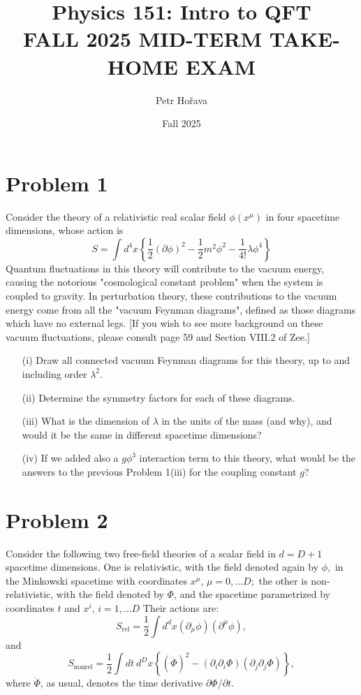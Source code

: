 \documentclass[12pt]{article}
\title{Physics 151: Intro to QFT \\ FALL 2025 MID-TERM TAKE-HOME EXAM}
\author{Petr Hořava}
\date{Fall 2025}
\begin{document}
\maketitle

\section*{Problem 1}

Consider the theory of a relativistic real scalar field $\phi(x^{\mu})$ in four spacetime dimensions, whose action is
$$S=\int d^{4}x\left\{\frac{1}{2}(\partial\phi)^{2}-\frac{1}{2}m^{2}\phi^{2}-\frac{1}{4!}\lambda\phi^{4}\right\}$$
Quantum fluctuations in this theory will contribute to the vacuum energy, causing the notorious "cosmological constant problem" when the system is coupled to gravity. In perturbation theory, these contributions to the vacuum energy come from all the "vacuum Feynman diagrams", defined as those diagrams which have no external legs. [If you wish to see more background on these vacuum fluctuations, please consult page 59 and Section VIII.2 of Zee.]

\begin{enumerate}
    \item[(i)] Draw all connected vacuum Feynman diagrams for this theory, up to and including order $\lambda^{2}.$
    \item[(ii)] Determine the symmetry factors for each of these diagrams.
    \item[(iii)] What is the dimension of $\lambda$ in the units of the mass (and why), and would it be the same in different spacetime dimensions?
    \item[(iv)] If we added also a $g\phi^{3}$ interaction term to this theory, what would be the answers to the previous Problem 1(iii) for the coupling constant $g$?
\end{enumerate}

\section*{Problem 2}

Consider the following two free-field theories of a scalar field in $d=D+1$ spacetime dimensions. One is relativistic, with the field denoted again by $\phi,$ in the Minkowski spacetime with coordinates $x^{\mu}$, $\mu=0,...D;$ the other is non-relativistic, with the field denoted by $\Phi$, and the spacetime parametrized by coordinates $t$ and $x^{i}$, $i=1,...D$ Their actions are:
$$S_{\text{rel}}=\frac{1}{2}\int d^{d}x(\partial_{\mu}\phi)(\partial^{\mu}\phi),$$
and
$$S_{\text{nonrel}}=\frac{1}{2}\int dt~d^{D}x\left\{(\dot{\Phi})^{2}-(\partial_{i}\partial_{i}\Phi)(\partial_{j}\partial_{j}\Phi)\right\},$$
where $\dot{\Phi}$, as usual, denotes the time derivative $\partial\Phi/\partial t$.
\end{document}
